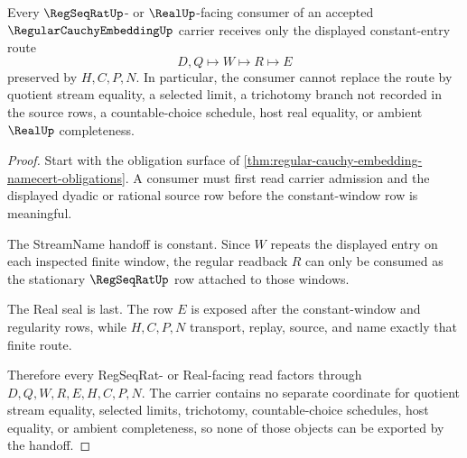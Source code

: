 \begin{theorem}
\label{thm:regular-cauchy-embedding-constant-handoff}
Every $\RegSeqRatUp$- or $\RealUp$-facing consumer of an accepted $\RegularCauchyEmbeddingUp$ carrier receives only the displayed constant-entry route
$$
D,Q \longmapsto W \longmapsto R \longmapsto E
$$
preserved by $H,C,P,N$. In particular, the consumer cannot replace the route by quotient stream equality, a selected limit, a trichotomy branch not recorded in the source rows, a countable-choice schedule, host real equality, or ambient $\RealUp$ completeness.
\end{theorem}
\begin{proof}
Start with the obligation surface of \autoref{thm:regular-cauchy-embedding-namecert-obligations}. A consumer must first read carrier admission and the displayed dyadic or rational source row before the constant-window row is meaningful.

The StreamName handoff is constant. Since $W$ repeats the displayed entry on each inspected finite window, the regular readback $R$ can only be consumed as the stationary $\RegSeqRatUp$ row attached to those windows.

The Real seal is last. The row $E$ is exposed after the constant-window and regularity rows, while $H,C,P,N$ transport, replay, source, and name exactly that finite route.

Therefore every RegSeqRat- or Real-facing read factors through $D,Q,W,R,E,H,C,P,N$. The carrier contains no separate coordinate for quotient stream equality, selected limits, trichotomy, countable-choice schedules, host equality, or ambient completeness, so none of those objects can be exported by the handoff.
\end{proof}



